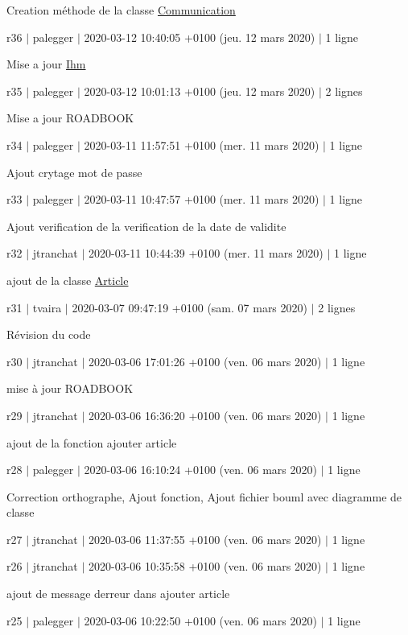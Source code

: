 Creation méthode de la classe \hyperlink{class_communication}{Communication}

r36 $\vert$ palegger $\vert$ 2020-\/03-\/12 10\+:40\+:05 +0100 (jeu. 12 mars 2020) $\vert$ 1 ligne

Mise a jour \hyperlink{class_ihm}{Ihm}

r35 $\vert$ palegger $\vert$ 2020-\/03-\/12 10\+:01\+:13 +0100 (jeu. 12 mars 2020) $\vert$ 2 lignes

Mise a jour R\+O\+A\+D\+B\+O\+OK

r34 $\vert$ palegger $\vert$ 2020-\/03-\/11 11\+:57\+:51 +0100 (mer. 11 mars 2020) $\vert$ 1 ligne

Ajout crytage mot de passe

r33 $\vert$ palegger $\vert$ 2020-\/03-\/11 10\+:47\+:57 +0100 (mer. 11 mars 2020) $\vert$ 1 ligne

Ajout verification de la verification de la date de validite

r32 $\vert$ jtranchat $\vert$ 2020-\/03-\/11 10\+:44\+:39 +0100 (mer. 11 mars 2020) $\vert$ 1 ligne

ajout de la classe \hyperlink{class_article}{Article}

r31 $\vert$ tvaira $\vert$ 2020-\/03-\/07 09\+:47\+:19 +0100 (sam. 07 mars 2020) $\vert$ 2 lignes

Révision du code

r30 $\vert$ jtranchat $\vert$ 2020-\/03-\/06 17\+:01\+:26 +0100 (ven. 06 mars 2020) $\vert$ 1 ligne

mise à jour R\+O\+A\+D\+B\+O\+OK

r29 $\vert$ jtranchat $\vert$ 2020-\/03-\/06 16\+:36\+:20 +0100 (ven. 06 mars 2020) $\vert$ 1 ligne

ajout de la fonction ajouter article

r28 $\vert$ palegger $\vert$ 2020-\/03-\/06 16\+:10\+:24 +0100 (ven. 06 mars 2020) $\vert$ 1 ligne

Correction orthographe, Ajout fonction, Ajout fichier bouml avec diagramme de classe

r27 $\vert$ jtranchat $\vert$ 2020-\/03-\/06 11\+:37\+:55 +0100 (ven. 06 mars 2020) $\vert$ 1 ligne

r26 $\vert$ jtranchat $\vert$ 2020-\/03-\/06 10\+:35\+:58 +0100 (ven. 06 mars 2020) $\vert$ 1 ligne

ajout de m\textquotesingle{}essage d\textquotesingle{}erreur dans ajouter article

r25 $\vert$ palegger $\vert$ 2020-\/03-\/06 10\+:22\+:50 +0100 (ven. 06 mars 2020) $\vert$ 1 ligne

